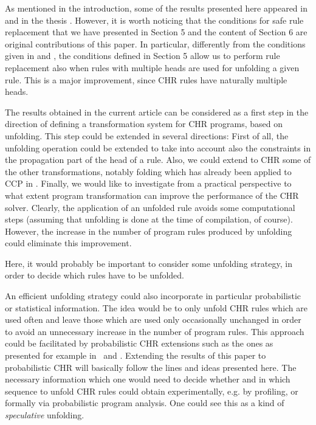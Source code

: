 \documentclass{tlp}
\begin{document}
As mentioned in the introduction, some of the results presented here appeared in
\cite{TMG07} and in the thesis  \cite{Tac08}. However, it is worth noticing that
the conditions for safe rule replacement that we have presented in Section 5
and the content of Section 6 are original contributions of this paper.
In particular, differently from the conditions given in \cite{TMG07} and \cite{Tac08},
the conditions defined in Section 5 allow us to perform rule replacement also when rules with multiple heads
are used for unfolding a
given rule. This is a major improvement, since CHR rules have naturally multiple heads.


The results obtained in the current article can
be considered as a first step
in the direction of defining a transformation system for CHR programs,
based on unfolding. This step could be extended in several directions:
First of all, the unfolding operation could be extended to take
into account also the constraints in the propagation part of the head
of a rule.
Also, we could extend to CHR some of the other transformations,
notably folding \cite{TS84} which has already been applied to CCP in \cite{EGM01}.
Finally, we would like to investigate from a practical perspective
to what extent program transformation can improve the
performance of the CHR solver. Clearly, the application of an
unfolded rule avoids some computational steps (assuming  that
unfolding is done at the time of compilation, of course). However, the
increase in the number of program rules produced by unfolding could eliminate this improvement.

Here, it would probably be important to consider some unfolding
strategy, in order to decide which rules have to be unfolded.



An efficient unfolding strategy could also incorporate in particular
probabilistic or statistical information. The idea would be to only unfold 
CHR rules which are used often and leave those which are used only 
occasionally unchanged in order to avoid an unnecessary increase in the
number of program rules. This approach could be facilitated by probabilistic 
CHR extensions such as the ones as presented for example
in \cite{WFLP02}\ and \cite{CHRPrism}.  Extending the results of this paper
to probabilistic CHR will basically follow the lines and ideas presented here.
The necessary information
which one would need to decide whether and in which sequence to 
unfold CHR rules could obtain experimentally, e.g. by profiling, or formally 
via probabilistic program analysis. One could see this as a kind
of {\em speculative} unfolding.
\end{document}
